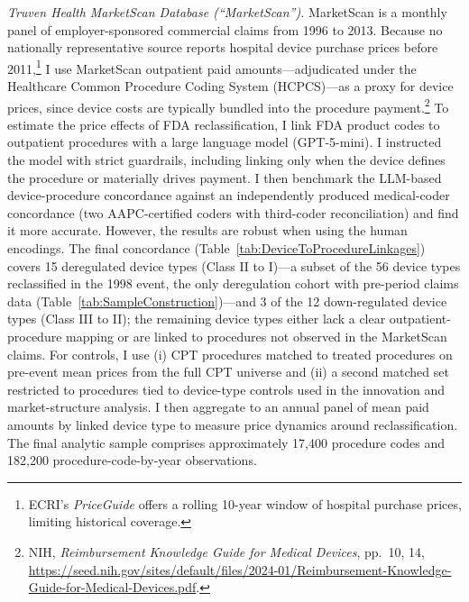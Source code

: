 \documentclass[letterpaper,12pt]{article}
\theoremstyle{definition}
\begin{document}
\textit{Truven Health MarketScan Database (``MarketScan'').} MarketScan is a monthly panel of employer-sponsored commercial claims from 1996 to 2013. Because no nationally representative source reports hospital device purchase prices before 2011,\footnote{ECRI's \textit{PriceGuide} offers a rolling 10-year window of hospital purchase prices, limiting historical coverage.} I use MarketScan outpatient paid amounts---adjudicated under the Healthcare Common Procedure Coding System (HCPCS)---as a proxy for device prices, since device costs are typically bundled into the procedure payment.\footnote{NIH, \emph{Reimbursement Knowledge Guide for Medical Devices}, pp.~10, 14, \url{https://seed.nih.gov/sites/default/files/2024-01/Reimbursement-Knowledge-Guide-for-Medical-Devices.pdf}.} To estimate the price effects of FDA reclassification, I link FDA product codes to outpatient procedures with a large language model (GPT-5-mini). I instructed the model with strict guardrails, including linking only when the device defines the procedure or materially drives payment.\footnotemark
{}
I then benchmark the LLM-based device-procedure concordance against an independently produced medical-coder concordance (two AAPC-certified coders with third-coder reconciliation) and find it more accurate.\footnotemark
{} However, the results are robust when using the human encodings. The final concordance (Table~\ref{tab:DeviceToProcedureLinkages}) covers 15 deregulated device types (Class II to I)---a subset of the 56 device types reclassified in the 1998 event, the only deregulation cohort with pre-period claims data (Table~\ref{tab:SampleConstruction})---and 3 of the 12 down-regulated device types (Class III to II); the remaining device types either lack a clear outpatient-procedure mapping or are linked to procedures not observed in the MarketScan claims. For controls, I use (i) CPT procedures matched to treated procedures on pre-event mean prices from the full CPT universe and (ii) a second matched set restricted to procedures tied to device-type controls used in the innovation and market-structure analysis. I then aggregate to an annual panel of mean paid amounts by linked device type to measure price dynamics around reclassification. The final analytic sample comprises approximately 17,400 procedure codes and 182,200 procedure-code-by-year observations.
\end{document}
